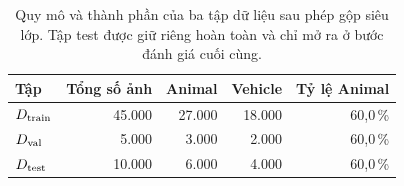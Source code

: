 \begin{table}[htbp]
  \centering
  \small
  \begin{tabular}{@{}l r r r r@{}}
    \toprule
    Tập & Tổng số ảnh & Animal & Vehicle & Tỷ lệ Animal \\
    \midrule
    $D_{\mathrm{train}}$ & 45.000 & 27.000 & 18.000 & 60{,}0\,\% \\
    $D_{\mathrm{val}}$   & 5.000  & 3.000  & 2.000  & 60{,}0\,\% \\
    $D_{\mathrm{test}}$  & 10.000 & 6.000  & 4.000  & 60{,}0\,\% \\
    \bottomrule
  \end{tabular}
  \caption{Quy mô và thành phần của ba tập dữ liệu sau phép gộp siêu lớp. Tập test được giữ riêng hoàn toàn và chỉ mở ra ở bước đánh giá cuối cùng.}
  \label{tab:split}
\end{table}